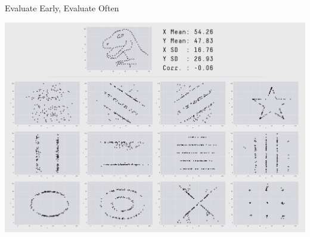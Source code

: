 \begin{frame}[c]{Evaluate Early, Evaluate Often}
    \begin{center}
        \includegraphics[width=.6\textwidth]{datasaurus}
    \end{center}
\end{frame}


